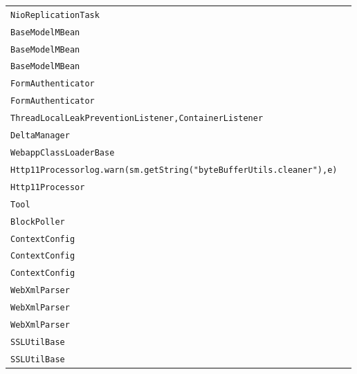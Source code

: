 \begin{center}
\begin{tabular}{ll}
\lstinline/NioReplicationTask/&\raisebox{0pt}{\lstinline/ sendAck(SelectionKey)/}\\ 
\lstinline/BaseModelMBean/&\raisebox{0pt}{\lstinline/ setAttribute(Attribute)/}\\ 
\lstinline/BaseModelMBean/&\raisebox{0pt}{\lstinline/ setAttribute(Attribute)/}\\ 
\lstinline/BaseModelMBean/&\raisebox{0pt}{\lstinline/ setAttribute(Attribute)/}\\ 
\lstinline/FormAuthenticator/&\raisebox{0pt}{\lstinline/ forwardToErrorPage(Request)/}\\ 
\lstinline/FormAuthenticator/&\raisebox{0pt}{\lstinline/ forwardToErrorPage(Request)/}\\ 
\lstinline/ThreadLocalLeakPreventionListener,ContainerListener/&\raisebox{0pt}{\lstinline/ containerEvent(ContainerEvent)/}\\ 
\lstinline/DeltaManager/&\raisebox{0pt}{\lstinline/ messageReceived(SessionMessage,Member)/}\\ 
\lstinline/WebappClassLoaderBase/&\raisebox{0pt}{\lstinline/ findClassInternal(String)/}\\ 
\lstinline/Http11Processorlog.warn(sm.getString("byteBufferUtils.cleaner"),e)/&\raisebox{0pt}{\lstinline/ sslReHandShake()/}\\ 
\lstinline/Http11Processor/&\raisebox{0pt}{\lstinline/ sslReHandShake()/}\\ 
\lstinline/Tool/&\raisebox{0pt}{\lstinline/ usage()/}\\ 
\lstinline/BlockPoller/&\raisebox{0pt}{\lstinline/ run()/}\\ 
\lstinline/ContextConfig/&\raisebox{0pt}{\lstinline/ processAnnotationsFile(File,boolean)/}\\ 
\lstinline/ContextConfig/&\raisebox{0pt}{\lstinline/ processAnnotationsFile(File,boolean)/}\\ 
\lstinline/ContextConfig/&\raisebox{0pt}{\lstinline/ processAnnotationsFile((File,boolean)/}\\ 
\lstinline/WebXmlParser/&\raisebox{0pt}{\lstinline/ booleanparseWebXml(InputSource)/}\\ 
\lstinline/WebXmlParser/&\raisebox{0pt}{\lstinline/ booleanparseWebXml(InputSource)/}\\ 
\lstinline/WebXmlParser/&\raisebox{0pt}{\lstinline/ booleanparseWebXml(InputSource)/}\\ 
\lstinline/SSLUtilBase/&\raisebox{0pt}{\lstinline/ KeyStoregetStore(String)/}\\ 
\lstinline/SSLUtilBase/&\raisebox{0pt}{\lstinline/ KeyStoregetStore(String)/}\\ 

\end{tabular}
\end{center}
